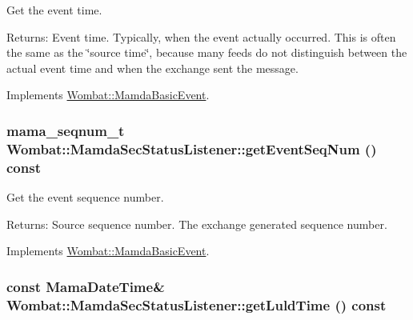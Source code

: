 Get the event time. 

\begin{Desc}
\item[Returns:]Event time. Typically, when the event actually occurred. This is often the same as the \char`\"{}source time\char`\"{}, because many feeds do not distinguish between the actual event time and when the exchange sent the message. \end{Desc}


Implements \hyperlink{classWombat_1_1MamdaBasicEvent_7285491c2c657207a64b1b0449c0339b}{Wombat::Mamda\-Basic\-Event}.\hypertarget{classWombat_1_1MamdaSecStatusListener_9abaf40f14dcb761b11026bd8ab7cd7d}{
\subsubsection[getEventSeqNum]{\setlength{\rightskip}{0pt plus 5cm}mama\_\-seqnum\_\-t Wombat::Mamda\-Sec\-Status\-Listener::get\-Event\-Seq\-Num () const}}
\label{classWombat_1_1MamdaSecStatusListener_9abaf40f14dcb761b11026bd8ab7cd7d}


Get the event sequence number. 

\begin{Desc}
\item[Returns:]Source sequence number. The exchange generated sequence number. \end{Desc}


Implements \hyperlink{classWombat_1_1MamdaBasicEvent_1fd845d48e95b4ee3beafc72d1ac2adf}{Wombat::Mamda\-Basic\-Event}.\hypertarget{classWombat_1_1MamdaSecStatusListener_e682f4bbb0863a87fac4e03fa77156c0}{
\subsubsection[getLuldTime]{\setlength{\rightskip}{0pt plus 5cm}const Mama\-Date\-Time\& Wombat::Mamda\-Sec\-Status\-Listener::get\-Luld\-Time () const}}
\label{classWombat_1_1MamdaSecStatusListener_e682f4bbb0863a87fac4e03fa77156c0}


